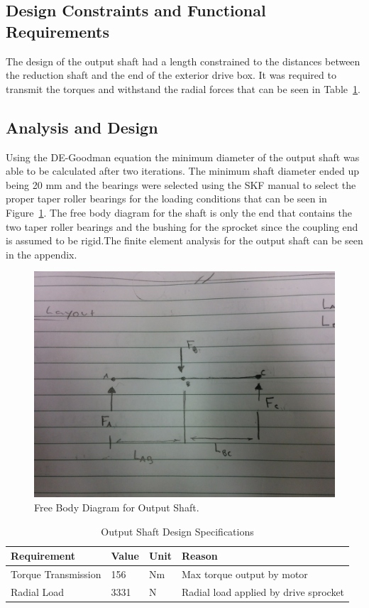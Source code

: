 \subsection{Design Constraints and Functional Requirements}
The design of the output shaft had a length constrained to the distances between the reduction shaft and the end of the exterior drive box. It was required to transmit the torques and withstand the radial forces that can be seen in Table~\ref{tab:output_shaft_specs}.   

\subsection{Analysis and Design}
Using the DE-Goodman equation the minimum diameter of the output shaft was able to be calculated after two iterations. The minimum shaft diameter ended up being 20 mm and the bearings were selected using the SKF manual to select the proper taper roller bearings for the loading conditions that can be seen in Figure~\ref{fig:fb_output_shaft}. The free body diagram for the shaft is only the end that contains the two taper roller bearings and the bushing for the sprocket since the coupling end is assumed to be rigid.The finite element analysis for the output shaft can be seen in the appendix.
\begin{figure}[htbp]
	\includegraphics[width=\linewidth]{images/fb_output_shaft.jpg}
	\caption{Free Body Diagram for Output Shaft.}
	\label{fig:fb_output_shaft}
\end{figure}
\begin{table}[htbp]
	\centering
	\caption{Output Shaft Design Specifications}
	\begin{tabular}{| p{5cm}lll |} \hline
		Requirement & Value & Unit & Reason \\ \hline
		Torque Transmission & 156 & Nm & Max torque output by motor \\
		Radial Load & 3331	& N & Radial load applied by drive sprocket \\ \hline
	\end{tabular}
	\label{tab:output_shaft_specs}
\end{table}


